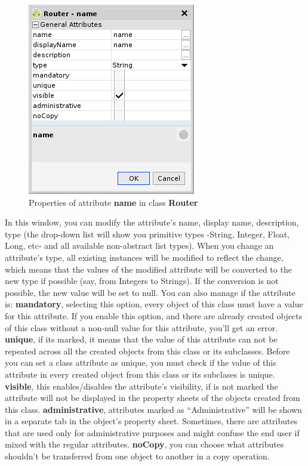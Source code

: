 \documentclass[a4paper]{article}
\begin{document}
\begin{itemize}
				\begin{figure}[h!]
					\centering
					\includegraphics[width=0.4\linewidth]{img/data_model_manager_class_attribute_details.png}
					\caption{Properties of attribute \textbf{name} in class \textbf{Router}}
					\label{fig:class_attribute_details}
				\end{figure}
			\end{itemize}
			In this window, you can modify the attribute's name, display name, description, type  (the drop-down list will show you primitive types -String, Integer, Float, Long, etc- and all available non-abstract list types). When you change an attribute's type, all existing instances will be	modified to reflect the change, which means that the values of the modified attribute will be converted to the new type if possible (say, from Integers to Strings). If the conversion is not possible, the new value will be set to null.  You can also manage if the attribute is:
			\newline \textbf{mandatory}, selecting this option, every object of this class must have a value for this attribute. If you enable this option, and there are already created objects of this class without a non-null value for this attribute, you'll get an error.  
			\newline \textbf{unique}, if its marked, it means that the value of this attribute can not be repeated across all the  created objects from this class or its subclasses.  Before you can set a class attribute as unique, you must check if the value of this attribute in every created object from this class or its subclases is unique.
			\newline \textbf{visible}, this enables/disables the attribute's visibility, if is not marked the attribute will not be displayed in the property sheets of the objects created from this class.  
			\newline \textbf{administrative}, attributes marked as “Administrative” will be shown in a separate tab in the object's property sheet. Sometimes, there are  attributes that are used only for administrative purposes and might confuse the end user if mixed with the regular attributes. 
			\newline \textbf{noCopy}, you can choose what attributes shouldn't be transferred from one object to another in a copy operation.
			
\end{document}
